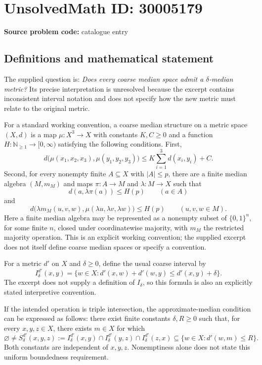 \documentclass[11pt]{article}
\newcommand{\N}{\mathbb{N}}
\begin{document}
\section*{UnsolvedMath ID: 30005179}
\textbf{Source problem code:} catalogue entry
\subsection{Definitions and mathematical statement}
The supplied question is: \emph{Does every coarse median space admit a $\delta$-median metric?} Its precise interpretation is unresolved because the excerpt contains inconsistent interval notation and does not specify how the new metric must relate to the original metric.

For a standard working convention, a coarse median structure on a metric space $(X,d)$ is a map $\mu\colon X^3\to X$ with constants $K,C\geq 0$ and a function $H\colon\N_{\geq 1}\to[0,\infty)$ satisfying the following conditions. First,
\[
 d\bigl(\mu(x_1,x_2,x_3),\mu(y_1,y_2,y_3)\bigr)
 \leq K\sum_{i=1}^3 d(x_i,y_i)+C.
\]
Second, for every nonempty finite $A\subseteq X$ with $|A|\leq p$, there are a finite median algebra $(M,m_M)$ and maps $\pi\colon A\to M$ and $\lambda\colon M\to X$ such that
\[
 d(a,\lambda\pi(a))\leq H(p)\qquad(a\in A)
\]
and
\[
 d\bigl(\lambda m_M(u,v,w),\mu(\lambda u,\lambda v,\lambda w)\bigr)
 \leq H(p)\qquad(u,v,w\in M).
\]
Here a finite median algebra may be represented as a nonempty subset of $\{0,1\}^n$, for some finite $n$, closed under coordinatewise majority, with $m_M$ the restricted majority operation. This is an explicit working convention; the supplied excerpt does not itself define coarse median spaces or specify a convention.

For a metric $d'$ on $X$ and $\delta\geq 0$, define the usual coarse interval by
\[
 I^{d'}_\delta(x,y)
 =\{w\in X:d'(x,w)+d'(w,y)\leq d'(x,y)+\delta\}.
\]
The excerpt does not supply a definition of $I_\delta$, so this formula is also an explicitly stated interpretive convention.

If the intended operation is triple intersection, the approximate-median condition can be expressed as follows: there exist finite constants $\delta,R\geq 0$ such that, for every $x,y,z\in X$, there exists $m\in X$ for which
\[
 \varnothing\neq
 S^{d'}_\delta(x,y,z)
 :=I^{d'}_\delta(x,y)\cap I^{d'}_\delta(y,z)\cap I^{d'}_\delta(z,x)
 \subseteq \{w\in X:d'(w,m)\leq R\}.
\]
Both constants are independent of $x,y,z$. Nonemptiness alone does not state this uniform boundedness requirement.
\end{document}
